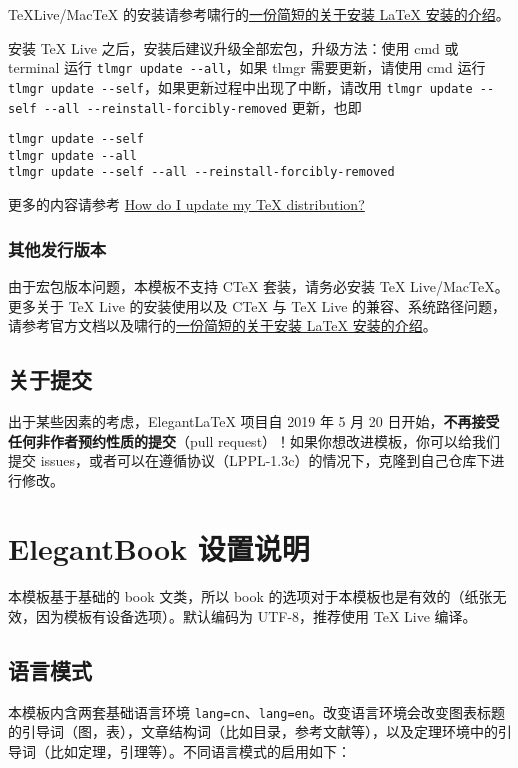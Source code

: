 \documentclass[lang=cn,10pt]{elegantbook}
\begin{document}
\TeX Live/Mac\TeX{} 的安装请参考啸行的\href{https://github.com/OsbertWang/install-latex-guide-zh-cn/releases/}{一份简短的关于安装 \LaTeX{} 安装的介绍}。

安装 \TeX{} Live 之后，安装后建议升级全部宏包，升级方法：使用 cmd 或 terminal 运行 \lstinline{tlmgr update --all}，如果 tlmgr 需要更新，请使用 cmd 运行 \lstinline{tlmgr update --self}，如果更新过程中出现了中断，请改用 \lstinline{tlmgr update --self --all --reinstall-forcibly-removed} 更新，也即

\begin{lstlisting}
tlmgr update --self 
tlmgr update --all
tlmgr update --self --all --reinstall-forcibly-removed
\end{lstlisting}

更多的内容请参考 \href{https://tex.stackexchange.com/questions/55437/how-do-i-update-my-tex-distribution}{How do I update my \TeX{} distribution?}

\subsection{其他发行版本}

由于宏包版本问题，本模板不支持 C\TeX{} 套装，请务必安装 TeX Live/Mac\TeX{}。更多关于 \TeX{} Live 的安装使用以及 C\TeX{} 与 \TeX{} Live 的兼容、系统路径问题，请参考官方文档以及啸行的\href{https://github.com/OsbertWang/install-latex-guide-zh-cn/releases/}{一份简短的关于安装 \LaTeX{} 安装的介绍}。


\section{关于提交}

出于某些因素的考虑，Elegant\LaTeX{} 项目自 2019 年 5 月 20 日开始，\textbf{不再接受任何非作者预约性质的提交}（pull request）！如果你想改进模板，你可以给我们提交 issues，或者可以在遵循协议（LPPL-1.3c）的情况下，克隆到自己仓库下进行修改。


\chapter{ElegantBook 设置说明}

本模板基于基础的 book 文类，所以 book 的选项对于本模板也是有效的（纸张无效，因为模板有设备选项）。默认编码为 UTF-8，推荐使用 \TeX{} Live 编译。

\section{语言模式}
本模板内含两套基础语言环境 \lstinline{lang=cn}、\lstinline{lang=en}。改变语言环境会改变图表标题的引导词（图，表），文章结构词（比如目录，参考文献等），以及定理环境中的引导词（比如定理，引理等）。不同语言模式的启用如下：
\end{document}
